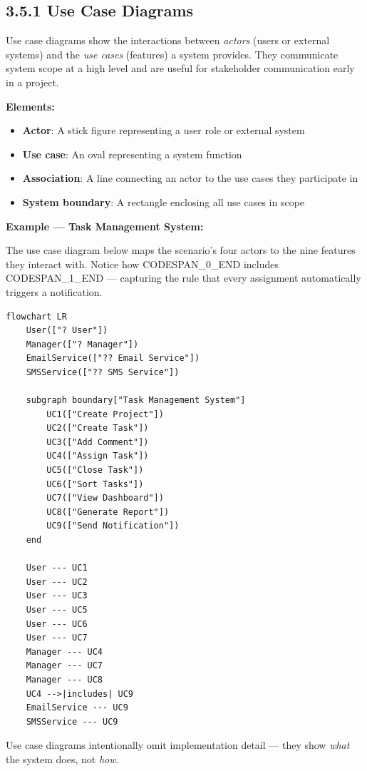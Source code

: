 \documentclass[11pt,a4paper]{book}
\begin{document}
\subsection{3.5.1 Use Case Diagrams}

Use case diagrams show the interactions between \textit{actors} (users or external systems) and the \textit{use cases} (features) a system provides. They communicate system scope at a high level and are useful for stakeholder communication early in a project.

\textbf{Elements:}
\begin{itemize}
  \item \textbf{Actor}: A stick figure representing a user role or external system
  \item \textbf{Use case}: An oval representing a system function
  \item \textbf{Association}: A line connecting an actor to the use cases they participate in
  \item \textbf{System boundary}: A rectangle enclosing all use cases in scope
\end{itemize}

\textbf{Example --- Task Management System:}

The use case diagram below maps the scenario's four actors to the nine features they interact with. Notice how CODESPAN\_0\_END includes CODESPAN\_1\_END --- capturing the rule that every assignment automatically triggers a notification.

\begin{lstlisting}
flowchart LR
    User(["? User"])
    Manager(["? Manager"])
    EmailService(["?? Email Service"])
    SMSService(["?? SMS Service"])

    subgraph boundary["Task Management System"]
        UC1(["Create Project"])
        UC2(["Create Task"])
        UC3(["Add Comment"])
        UC4(["Assign Task"])
        UC5(["Close Task"])
        UC6(["Sort Tasks"])
        UC7(["View Dashboard"])
        UC8(["Generate Report"])
        UC9(["Send Notification"])
    end

    User --- UC1
    User --- UC2
    User --- UC3
    User --- UC5
    User --- UC6
    User --- UC7
    Manager --- UC4
    Manager --- UC7
    Manager --- UC8
    UC4 -->|includes| UC9
    EmailService --- UC9
    SMSService --- UC9
\end{lstlisting}

Use case diagrams intentionally omit implementation detail --- they show \textit{what} the system does, not \textit{how}.
\end{document}
